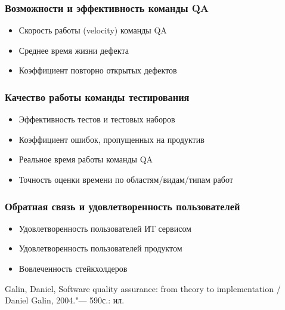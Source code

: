 \documentclass{../industrial-development}
\begin{document}
	\begin{frame} \frametitle{Возможности и эффективность команды QA}
		\begin{itemize}
			\item Скорость работы (velocity) команды QA
			\item Среднее время жизни дефекта
			\item Коэффициент повторно открытых дефектов
		\end{itemize}
	\end{frame}

	\begin{frame} \frametitle{Качество работы команды тестирования}
		\begin{itemize}
			\item Эффективность тестов и тестовых наборов
			\item Коэффициент ошибок, пропущенных на продуктив
			\item Реальное время работы команды QA
			\item Точность оценки времени по областям/видам/типам работ
		\end{itemize}
	\end{frame}

	\begin{frame} \frametitle{Обратная связь и удовлетворенность пользователей}
		\begin{itemize}
			\item Удовлетворенность пользователей ИТ сервисом
			\item Удовлетворенность пользователей продуктом
			\item Вовлеченность стейкхолдеров
		\end{itemize}
	\end{frame}

	\begin{thebibliography}{99}
		 Galin, Daniel, Software quality assurance: from theory to implementation / Daniel Galin, 2004."--- 590с.: ил.
	\end{thebibliography}
	
\end{document}
